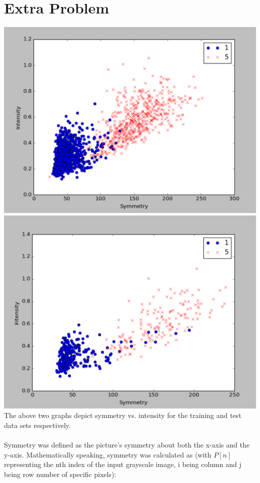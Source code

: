 \documentclass[12pt]{article}
\begin{document}
\section*{Extra Problem}
\includegraphics[scale=.75]{extra.png}
\\ \includegraphics[scale=.75]{extra2.png}
\\ The above two graphs depict symmetry vs. intensity for the training and test data sets respectively.
\\ \\ Symmetry was defined as the picture's symmetry about both the x-axis and the y-axis. Mathematically speaking, symmetry was calculated as (with $P[n]$ representing the nth index of the input grayscale image, i being column and j being row number of specific pixels):
\end{document}
